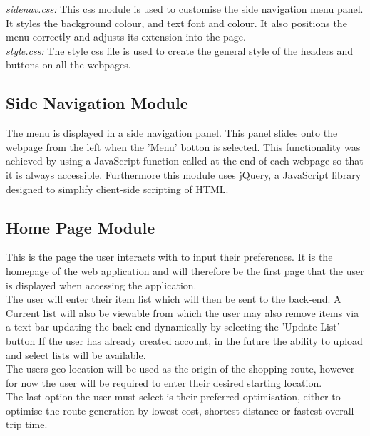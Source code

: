 \documentclass[10pt, a4paper, twocolumn]{scrartcl}
\begin{document}
		\textit{sidenav.css:} This css module is used to customise the side navigation menu panel. It styles the background colour, and text font and colour. It also positions the menu correctly and adjusts its extension into the page.\\
		
		\textit{style.css:} The style css file is used to create the general style of the headers and buttons on all the webpages.
		
		\subsection{Side Navigation Module}
		
		The menu is displayed in a side navigation panel. This panel slides onto the webpage from the left when the 'Menu' botton is selected. This functionality was achieved by using a JavaScript function called at the end of each webpage so that it is always accessible. Furthermore this module uses jQuery, a JavaScript library designed to simplify client-side scripting of HTML.	
		
		\subsection{Home Page Module}
		
		This is the page the user interacts with to input their preferences. It is the homepage of the web application and will therefore be the first page that the user is displayed when accessing the application.\\
		
		The user will enter their item list which will then be sent to the back-end. A Current list will also be viewable from which the user may also remove items via a text-bar updating the back-end dynamically by selecting the 'Update List' button If the user has already created account, in the future the ability to upload and select lists will be available. \\
		
		The users geo-location will be used as the origin of the shopping route, however for now the user will be required to enter their desired starting location.\\
		
		The last option the user must select is their preferred optimisation, either to optimise the route generation by lowest cost, shortest distance or fastest overall trip time.\\
		
\end{document}
